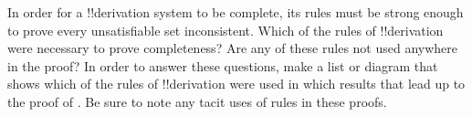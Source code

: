 \documentclass[../../../include/open-logic-section]{subfiles}
\begin{document}
\begin{prob}
In order for a !!{derivation} system to be complete, its rules must be
strong enough to prove every unsatisfiable set inconsistent.  Which of
the rules of !!{derivation} were necessary to prove completeness?  Are any
of these rules not used anywhere in the proof?  In order to answer
these questions, make a list or diagram that shows which of the rules
of !!{derivation} were used in which results that lead up to the proof of
.  Be sure to note any tacit
uses of rules in these proofs.
\end{prob}
\end{document}
